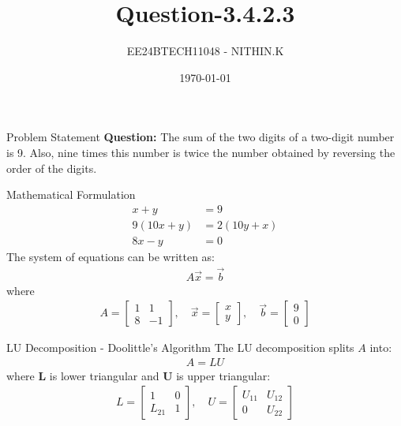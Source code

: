 \documentclass{beamer}
\title{Question-3.4.2.3}
\author{EE24BTECH11048 - NITHIN.K}
\institute{\textbf{LU Decomposition using Doolittle's Algorithm}}
\date{\today}
\begin{document}
\begin{frame}
    \titlepage
\end{frame}

\begin{frame}{Problem Statement}
    \textbf{Question:} The sum of the two digits of a two-digit number is 9. Also, nine times this number is twice the number obtained by reversing the order of the digits.
\end{frame}

\begin{frame}{Mathematical Formulation}
    \begin{align}
        x + y &= 9 \\
        9(10x + y) &= 2(10y + x) \\
        8x - y &= 0
    \end{align}
    The system of equations can be written as:
    \begin{align}
        A\vec{x} = \vec{b}
    \end{align}
    where
    \begin{align}
        A = \begin{bmatrix}1 & 1 \\ 8 & -1\end{bmatrix}, \quad \vec{x} = \begin{bmatrix}x \\ y\end{bmatrix}, \quad \vec{b} = \begin{bmatrix}9 \\ 0\end{bmatrix}
    \end{align}
\end{frame}

\begin{frame}{LU Decomposition - Doolittle's Algorithm}
    The LU decomposition splits $A$ into:
    \begin{align}
        A = LU
    \end{align}
    where \textbf{L} is lower triangular and \textbf{U} is upper triangular:
    \begin{align}
        L = \begin{bmatrix} 1 & 0 \\ L_{21} & 1 \end{bmatrix}, \quad
        U = \begin{bmatrix} U_{11} & U_{12} \\ 0 & U_{22} \end{bmatrix}
    \end{align}
\end{frame}
\end{document}
